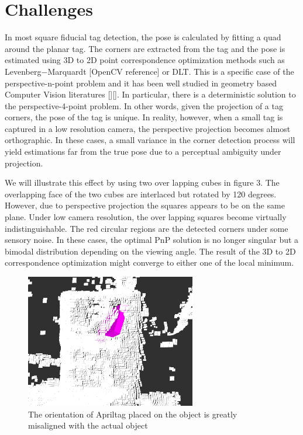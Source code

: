 \section{Challenges}
\label{sec:problem}
In most square fiducial tag detection, the pose is calculated by fitting a quad around the planar tag. The corners are extracted from the tag and the pose is estimated using 3D to 2D point correspondence optimization methods such as Levenberg$-$Marquardt [OpenCV reference] or DLT. This is a specific case of the perspective-n-point problem and it has been well studied in geometry based Computer Vision literatures [][]. In particular, there is a deterministic solution to the perspective-4-point problem. In other words, given the projection of a tag corners, the pose of the tag is unique. In reality, however,  when a small tag is captured in a low resolution camera, the perspective projection becomes almost orthographic. In these cases, a small variance in the corner detection process will yield estimations far from the true pose due to a perceptual ambiguity under projection. 

We will illustrate this effect by using two over lapping cubes in figure 3. The overlapping face of the two cubes are interlaced but rotated by 120 degrees. However, due to perspective projection the squares appears to be on the same plane. Under low camera resolution, the over lapping squares become virtually indistinguishable. The red circular regions are the detected corners under some sensory noise. In these cases, the optimal PnP solution is no longer singular but a bimodal distribution depending on the viewing angle. The result of the 3D to 2D correspondence optimization might converge to either one of the local minimum.
\begin{figure}
\centering
\includegraphics[width=\columnwidth]{figs/mismatch_tag}
\caption{The orientation of Apriltag placed on the object is greatly misaligned with the actual object}
\label{fig:calib}
\end{figure}

